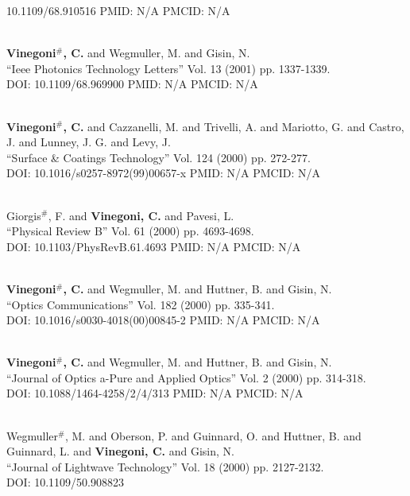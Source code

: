 10.1109/68.910516 PMID: N/A PMCID: N/A\item {} \\ {\bf Vinegoni$^\#$, C.} and Wegmuller, M. and Gisin, N. \\ ``Ieee Photonics Technology Letters'' Vol. 13 (2001) pp. 1337-1339. \\ DOI: 10.1109/68.969900 PMID: N/A PMCID: N/A\item {} \\ {\bf Vinegoni$^\#$, C.} and Cazzanelli, M. and Trivelli, A. and Mariotto, G. and Castro, J. and Lunney, J. G. and Levy, J. \\ ``Surface & Coatings Technology'' Vol. 124 (2000) pp. 272-277. \\ DOI: 10.1016/s0257-8972(99)00657-x PMID: N/A PMCID: N/A\item {} \\ Giorgis$^\#$, F. and {\bf Vinegoni, C.} and Pavesi, L. \\ ``Physical Review B'' Vol. 61 (2000) pp. 4693-4698. \\ DOI: 10.1103/PhysRevB.61.4693 PMID: N/A PMCID: N/A\item {} \\ {\bf Vinegoni$^\#$, C.} and Wegmuller, M. and Huttner, B. and Gisin, N. \\ ``Optics Communications'' Vol. 182 (2000) pp. 335-341. \\ DOI: 10.1016/s0030-4018(00)00845-2 PMID: N/A PMCID: N/A\item {} \\ {\bf Vinegoni$^\#$, C.} and Wegmuller, M. and Huttner, B. and Gisin, N. \\ ``Journal of Optics a-Pure and Applied Optics'' Vol. 2 (2000) pp. 314-318. \\ DOI: 10.1088/1464-4258/2/4/313 PMID: N/A PMCID: N/A\item {} \\ Wegmuller$^\#$, M. and Oberson, P. and Guinnard, O. and Huttner, B. and Guinnard, L. and {\bf Vinegoni, C.} and Gisin, N. \\ ``Journal of Lightwave Technology'' Vol. 18 (2000) pp. 2127-2132. \\ DOI: 10.1109/50.908823 